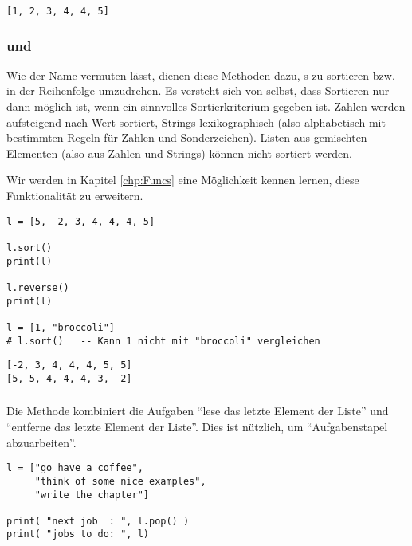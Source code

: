 \begin{cmdbox}[Ausgabe]
\begin{verbatim}
[1, 2, 3, 4, 4, 5]
\end{verbatim}
\end{cmdbox}

\subsubsection{ und }
Wie der Name vermuten lässt, dienen diese Methoden dazu, s zu sortieren bzw. in der Reihenfolge umzudrehen. Es versteht sich von selbst, dass Sortieren nur dann möglich ist, wenn ein sinnvolles Sortierkriterium gegeben ist. Zahlen werden aufsteigend nach Wert sortiert, Strings lexikographisch (also alphabetisch mit bestimmten Regeln für Zahlen und Sonderzeichen). Listen aus gemischten Elementen (also aus Zahlen und Strings) können nicht sortiert werden.

Wir werden in Kapitel \ref{chp:Funcs} eine Möglichkeit kennen lernen, diese Funktionalität zu erweitern.

\begin{codebox}
\begin{verbatim}
l = [5, -2, 3, 4, 4, 4, 5]

l.sort()
print(l)

l.reverse()
print(l)

l = [1, "broccoli"]
# l.sort()   -- Kann 1 nicht mit "broccoli" vergleichen
\end{verbatim}
\end{codebox}

\begin{cmdbox}[Ausgabe]
\begin{verbatim}
[-2, 3, 4, 4, 4, 5, 5]
[5, 5, 4, 4, 4, 3, -2]
\end{verbatim}
\end{cmdbox}

\subsubsection{}
Die Methode  kombiniert die Aufgaben \enquote{lese das letzte Element der Liste} und \enquote{entferne das letzte Element der Liste}. Dies ist nützlich, um \enquote{Aufgabenstapel abzuarbeiten}.

\begin{codebox}
\begin{verbatim}
l = ["go have a coffee", 
     "think of some nice examples", 
     "write the chapter"]

print( "next job  : ", l.pop() )
print( "jobs to do: ", l)
\end{verbatim}
\end{codebox}

